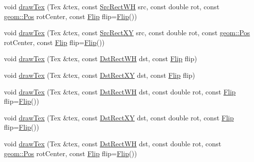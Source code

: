 \begin{DoxyCompactItemize}
\item 
void \mbox{\hyperlink{classrolmodl_1_1blend_mode_1_1_ren_a2edf12bf41e76d15e5103883dc4479ac}{draw\+Tex}} (Tex \&tex, const \mbox{\hyperlink{structrolmodl_1_1blend_mode_1_1_src_rect_w_h}{Src\+Rect\+WH}} src, const double rot, const \mbox{\hyperlink{structrolmodl_1_1geom_1_1_pos}{geom\+::\+Pos}} rot\+Center, const \mbox{\hyperlink{structrolmodl_1_1blend_mode_1_1_flip}{Flip}} flip=\mbox{\hyperlink{structrolmodl_1_1blend_mode_1_1_flip}{Flip}}())
\item 
void \mbox{\hyperlink{classrolmodl_1_1blend_mode_1_1_ren_a9cf698975c047f54f3fef379fe8d4c2e}{draw\+Tex}} (Tex \&tex, const \mbox{\hyperlink{structrolmodl_1_1blend_mode_1_1_src_rect_x_y}{Src\+Rect\+XY}} src, const double rot, const \mbox{\hyperlink{structrolmodl_1_1geom_1_1_pos}{geom\+::\+Pos}} rot\+Center, const \mbox{\hyperlink{structrolmodl_1_1blend_mode_1_1_flip}{Flip}} flip=\mbox{\hyperlink{structrolmodl_1_1blend_mode_1_1_flip}{Flip}}())
\item 
void \mbox{\hyperlink{classrolmodl_1_1blend_mode_1_1_ren_a3d435aeab5462eff98fcd63938c20349}{draw\+Tex}} (Tex \&tex, const \mbox{\hyperlink{structrolmodl_1_1blend_mode_1_1_dst_rect_w_h}{Dst\+Rect\+WH}} dst, const \mbox{\hyperlink{structrolmodl_1_1blend_mode_1_1_flip}{Flip}} flip)
\item 
void \mbox{\hyperlink{classrolmodl_1_1blend_mode_1_1_ren_acd1bc13956f4751b163945ba290f1724}{draw\+Tex}} (Tex \&tex, const \mbox{\hyperlink{structrolmodl_1_1blend_mode_1_1_dst_rect_x_y}{Dst\+Rect\+XY}} dst, const \mbox{\hyperlink{structrolmodl_1_1blend_mode_1_1_flip}{Flip}} flip)
\item 
void \mbox{\hyperlink{classrolmodl_1_1blend_mode_1_1_ren_a4d20c09728b60043353d37667f1b307e}{draw\+Tex}} (Tex \&tex, const \mbox{\hyperlink{structrolmodl_1_1blend_mode_1_1_dst_rect_w_h}{Dst\+Rect\+WH}} dst, const double rot, const \mbox{\hyperlink{structrolmodl_1_1blend_mode_1_1_flip}{Flip}} flip=\mbox{\hyperlink{structrolmodl_1_1blend_mode_1_1_flip}{Flip}}())
\item 
void \mbox{\hyperlink{classrolmodl_1_1blend_mode_1_1_ren_aeee16e798cab40b87691a697e77d238a}{draw\+Tex}} (Tex \&tex, const \mbox{\hyperlink{structrolmodl_1_1blend_mode_1_1_dst_rect_x_y}{Dst\+Rect\+XY}} dst, const double rot, const \mbox{\hyperlink{structrolmodl_1_1blend_mode_1_1_flip}{Flip}} flip=\mbox{\hyperlink{structrolmodl_1_1blend_mode_1_1_flip}{Flip}}())
\item 
void \mbox{\hyperlink{classrolmodl_1_1blend_mode_1_1_ren_ad90e1b5a6184e980e59a631bf6e5bae6}{draw\+Tex}} (Tex \&tex, const \mbox{\hyperlink{structrolmodl_1_1blend_mode_1_1_dst_rect_w_h}{Dst\+Rect\+WH}} dst, const double rot, const \mbox{\hyperlink{structrolmodl_1_1geom_1_1_pos}{geom\+::\+Pos}} rot\+Center, const \mbox{\hyperlink{structrolmodl_1_1blend_mode_1_1_flip}{Flip}} flip=\mbox{\hyperlink{structrolmodl_1_1blend_mode_1_1_flip}{Flip}}())

\end{DoxyCompactItemize}
